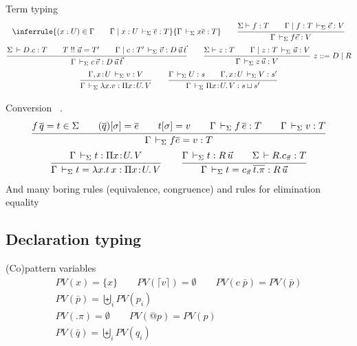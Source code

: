 \documentclass[acmlarge,fleqn]{acmart}\settopmatter{}
\begin{document}
Term typing 
\begin{gather*}
\inferrule
  {(x:U)\in \Gamma \qquad \Gamma \mid x:U \ders \overline{e}:T}
  {\Gamma \ders x \overline{e} : T}
\qquad
\ru{\Sigma \vdash f : T \qquad
    \Gamma \mid f : T \ders \vec e : V
   }{\Gamma \ders f \vec e : V}
\\
\ru{\Sigma \der D.c : T \qquad
    T \twobang \vec u = T' \qquad
    \Gamma \mid c : T' \ders \vec v : D \, \vec u \, \vec t
  }{\Gamma \ders c\,\vec v : D\,\vec u\,\vec t}
\qquad
\ru{\Sigma \vdash z : T \qquad
    \Gamma \mid z : T \ders \vec u : V
   }{\Gamma \ders z \, \vec u : V} \ z ::= D \mid R
\\
\ru{\Gamma, x \of U \ders v : V
  }{\Gamma \ders \lambda x.v : \funT x U V}
\qquad
\ru{\Gamma \ders U : s \qquad
    \Gamma, x \of U \ders V : s'
  }{\Gamma \ders \piT x U V : s \sqcup s'}
\end{gather*}


Conversion
\ .
\begin{gather*}
%
\ru{f\,\overline q = t \in \Sigma \qquad
    (\overline q)[\sigma] = \overline e \qquad
    t[\sigma] = v \qquad
    \Gamma \ders f\,\overline e : T \qquad
    \Gamma \ders v : T
  }{\Gamma \ders f \overline e = v : T}
\\
\ru{\Gamma \ders t : \funT x U V
  }{\Gamma \ders t = \lambda x. t\, x : \funT x U V}
\qquad
\ru{\Gamma \ders t : R\, \vec u \qquad
    \Sigma \der R.\cpi : T
  }{\Gamma \ders t = \cpi\,\overline{t .\pi} : R\,\vec u}
\\
\end{gather*}
And many boring rules (equivalence, congruence)
and rules for elimination equality


\subsection{Declaration typing}

(Co)pattern variables 
\begin{gather*}
PV(x) = \{ x \} \qquad PV (\lceil v \rceil) = \emptyset \qquad PV(c\; \bar{p}) = PV(\bar{p}) \\
PV(\bar{p}) = \biguplus_i PV(p_i) \\
PV(.\pi) = \emptyset \qquad PV(@p) = PV(p) \\
PV(\bar{q}) = \biguplus_i PV(q_i) \\
\end{gather*}
\end{document}
